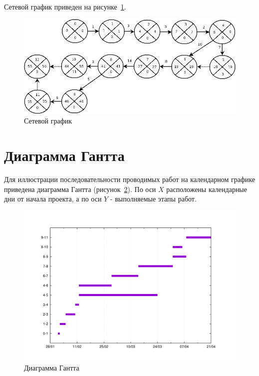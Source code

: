 Сетевой график приведен на рисунке~\ref{fig:netgraph}.
\begin{figure}
\centering
\includegraphics[scale=0.5]{pictures/netgraph}
\caption{Сетевой график}
\label{fig:netgraph}
\end{figure}

\section{Диаграмма Гантта}
Для иллюстрации последовательности проводимых работ на календарном графике приведена диаграмма Гантта (рисунок~\ref{fig:econom_gant}). По оси $X$ расположены календарные дни от начала проекта, а по оси $Y$ - выполняемые этапы работ.
\begin{figure}
\centering
\includegraphics[scale=0.2]{pictures/gantt}
\caption{Диаграмма Гантта}
\label{fig:econom_gant}
\end{figure}

